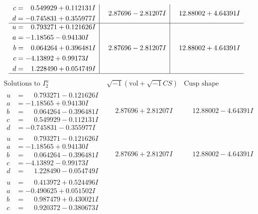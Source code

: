 \documentclass[1p]{elsarticle_modified}
\theoremstyle{definition}
\newcommand{\I}{\sqrt{-1}}
\begin{document}
$$\begin{array}{c|c|c}
\begin{aligned}
c &= \phantom{-}0.549929 + 0.112131 I \\
d &= -0.745831 + 0.355977 I\end{aligned}
 & \phantom{-}2.87696 - 2.81207 I & \phantom{-}12.88002 + 4.64391 I \\ \hline\begin{aligned}
u &= \phantom{-}0.793271 + 0.121626 I \\
a &= -1.18565 - 0.94130 I \\
b &= \phantom{-}0.064264 + 0.396481 I \\
c &= -4.13892 + 0.99173 I \\
d &= \phantom{-}1.228490 + 0.054749 I\end{aligned}
 & \phantom{-}2.87696 - 2.81207 I & \phantom{-}12.88002 + 4.64391 I\\
 \hline 
 \end{array}$$\newpage$$\begin{array}{c|c|c}  
\text{Solutions to }I^u_{2}& \I (\text{vol} + \sqrt{-1}CS) & \text{Cusp shape}\\
 \hline 
\begin{aligned}
u &= \phantom{-}0.793271 - 0.121626 I \\
a &= -1.18565 + 0.94130 I \\
b &= \phantom{-}0.064264 - 0.396481 I \\
c &= \phantom{-}0.549929 - 0.112131 I \\
d &= -0.745831 - 0.355977 I\end{aligned}
 & \phantom{-}2.87696 + 2.81207 I & \phantom{-}12.88002 - 4.64391 I \\ \hline\begin{aligned}
u &= \phantom{-}0.793271 - 0.121626 I \\
a &= -1.18565 + 0.94130 I \\
b &= \phantom{-}0.064264 - 0.396481 I \\
c &= -4.13892 - 0.99173 I \\
d &= \phantom{-}1.228490 - 0.054749 I\end{aligned}
 & \phantom{-}2.87696 + 2.81207 I & \phantom{-}12.88002 - 4.64391 I \\ \hline\begin{aligned}
u &= \phantom{-}0.413972 + 0.524496 I \\
a &= -0.490625 + 0.051502 I \\
b &= \phantom{-}0.987479 + 0.430021 I \\
c &= \phantom{-}0.920372 - 0.380673 I \\

\end{aligned}
\end{array}$$
\end{document}
